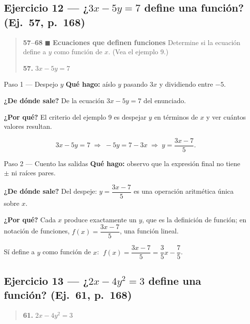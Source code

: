 \documentclass[11pt]{article}
\begin{document}
\subsection*{Ejercicio 12 — ¿$3x-5y=7$ define una función? (Ej.~57, p.~168)}

\begin{quote}
\textbf{57--68} $\blacksquare$ \textbf{Ecuaciones que definen funciones} \quad Determine si la ecuación define a $y$ como función de $x$. (Vea el ejemplo 9.)

\textbf{57.} $3x-5y=7$
\end{quote}

\begin{paso}{Paso 1 --- Despejo $y$}
\textbf{Qué hago:} aíslo $y$ pasando $3x$ y dividiendo entre $-5$.

\textbf{¿De dónde sale?} De la ecuación $3x-5y=7$ del enunciado.

\textbf{¿Por qué?} El criterio del ejemplo 9 es despejar $y$ en términos de $x$ y ver cuántos valores resultan.

\[
3x-5y=7 \;\Longrightarrow\; -5y=7-3x \;\Longrightarrow\; y=\frac{3x-7}{5}.
\]
\end{paso}

\begin{paso}{Paso 2 --- Cuento las salidas}
\textbf{Qué hago:} observo que la expresión final no tiene $\pm$ ni raíces pares.

\textbf{¿De dónde sale?} Del despeje: $y=\dfrac{3x-7}{5}$ es una operación aritmética única sobre $x$.

\textbf{¿Por qué?} Cada $x$ produce exactamente un $y$, que es la definición de función; en notación de funciones, $f(x)=\dfrac{3x-7}{5}$, una función lineal.
\end{paso}

\begin{resp}
Sí define a $y$ como función de $x$: $\;f(x)=\dfrac{3x-7}{5}=\dfrac{3}{5}x-\dfrac{7}{5}$.
\end{resp}

\subsection*{Ejercicio 13 — ¿$2x-4y^2=3$ define una función? (Ej.~61, p.~168)}

\begin{quote}
\textbf{61.} $2x-4y^2=3$
\end{quote}
\end{document}
